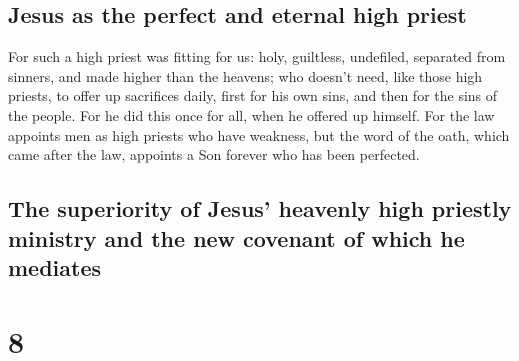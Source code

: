 \hypertarget{jesus-as-the-perfect-and-eternal-high-priest}{%
\subsection{Jesus as the perfect and eternal high
priest}\label{jesus-as-the-perfect-and-eternal-high-priest}}

 For such a high priest was fitting for us: holy,
guiltless, undefiled, separated from sinners, and made higher than the
heavens;  who doesn't need, like those high priests, to
offer up sacrifices daily, first for his own sins, and then for the sins
of the people. For he did this once for all, when he offered up himself.
 For the law appoints men as high priests who have
weakness, but the word of the oath, which came after the law, appoints a
Son forever who has been perfected.

\hypertarget{the-superiority-of-jesus-heavenly-high-priestly-ministry-and-the-new-covenant-of-which-he-mediates}{%
\subsection{The superiority of Jesus' heavenly high priestly ministry
and the new covenant of which he
mediates}\label{the-superiority-of-jesus-heavenly-high-priestly-ministry-and-the-new-covenant-of-which-he-mediates}}

\hypertarget{section-7}{%
\section{8}\label{section-7}}


